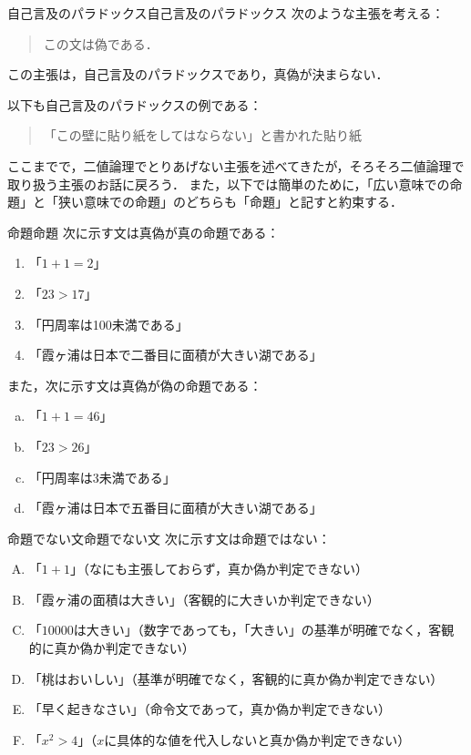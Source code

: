 \begin{example}{自己言及のパラドックス}{自己言及のパラドックス}
  次のような主張を考える：
  \begin{quote}
    この文は偽である．
  \end{quote}
  この主張は，自己言及のパラドックスであり，真偽が決まらない．

  以下も自己言及のパラドックスの例である：
  \begin{quote}
    「この壁に貼り紙をしてはならない」と書かれた貼り紙
  \end{quote}
\end{example}

ここまでで，二値論理でとりあげない主張を述べてきたが，そろそろ二値論理で取り扱う主張のお話に戻ろう．
また，以下では簡単のために，「広い意味での命題」と「狭い意味での命題」のどちらも「命題」と記すと約束する．

\begin{example}{命題}{命題}
  次に示す文は真偽が真の命題である：
  \begin{enumerate}[(1)]
    \item 「$1+1=2$」
    \item 「$23 > 17$」
    \item 「円周率は100未満である」
    \item 「霞ヶ浦は日本で二番目に面積が大きい湖である」
  \end{enumerate}
  また，次に示す文は真偽が偽の命題である：
  \begin{enumerate}[(a)]
    \item 「$1+1=46$」
    \item 「$23>26$」
    \item 「円周率は3未満である」
    \item 「霞ヶ浦は日本で五番目に面積が大きい湖である」
  \end{enumerate}
\end{example}

\begin{example}{命題でない文}{命題でない文}
  次に示す文は命題ではない：
  \begin{enumerate}[(A)]
    \item 「$1+1$」（なにも主張しておらず，真か偽か判定できない）
    \item 「霞ヶ浦の面積は大きい」（客観的に大きいか判定できない）
    \item 「$10000$は大きい」（数字であっても，「大きい」の基準が明確でなく，客観的に真か偽か判定できない）
    \item 「桃はおいしい」（基準が明確でなく，客観的に真か偽か判定できない）
    \item 「早く起きなさい」（命令文であって，真か偽か判定できない）
    \item 「$x^2 > 4$」（$x$に具体的な値を代入しないと真か偽か判定できない）\label{enu:命題でない文4}
  \end{enumerate}
\end{example}

